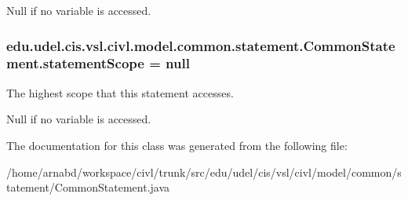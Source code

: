 Null if no variable is accessed. \hypertarget{classedu_1_1udel_1_1cis_1_1vsl_1_1civl_1_1model_1_1common_1_1statement_1_1CommonStatement_a69873bfcdaaf1f704605c5aa78172de0}{}
\subsubsection[{statement\+Scope}]{ edu.\+udel.\+cis.\+vsl.\+civl.\+model.\+common.\+statement.\+Common\+Statement.\+statement\+Scope = null\hspace{0.3cm}{\ttfamily [protected]}}\label{classedu_1_1udel_1_1cis_1_1vsl_1_1civl_1_1model_1_1common_1_1statement_1_1CommonStatement_a69873bfcdaaf1f704605c5aa78172de0}


The highest scope that this statement accesses. 

Null if no variable is accessed. 

The documentation for this class was generated from the following file\+:\begin{DoxyCompactItemize}
\item 
/home/arnabd/workspace/civl/trunk/src/edu/udel/cis/vsl/civl/model/common/statement/Common\+Statement.\+java\end{DoxyCompactItemize}
